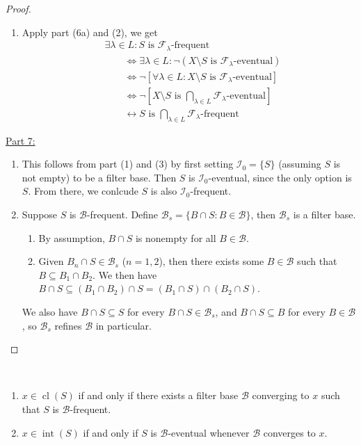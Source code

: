 \documentclass{treatise}
\begin{document}
\begin{proof}
\begin{enumerate}[label=(\alph*)]
    \item Apply part (6a) and (2), we get
    \begin{align*}
        & \exists \lambda \in L: S \mbox{ is } \mathcal{F}_\lambda \mbox{-frequent}
        \\
        & \qquad \Leftrightarrow \exists \lambda \in L: \neg(X \setminus S \mbox{ is } \mathcal{F}_\lambda \mbox{-eventual})
        \\
        & \qquad \Leftrightarrow \neg [\forall \lambda \in L: X \setminus S \mbox{ is } \mathcal{F}_\lambda \mbox{-eventual}]
        \\
        & \qquad \Leftrightarrow \neg \left[ X \setminus S \mbox{ is } \bigcap_{\lambda \in L} \mathcal{F}_\lambda \mbox{-eventual} \right]
        \\
        & \qquad \leftrightarrow S \mbox{ is } \bigcap_{\lambda \in L} \mathcal{F}_\lambda \mbox{-frequent}
    \end{align*}
\end{enumerate}
\underline{Part 7:}
\begin{enumerate}[label=(\alph*)]
    \item This follows from part (1) and (3) by first setting $\mathcal{I}_0 = \{ S \}$ (assuming $S$ is not empty) to be a filter base. Then $S$ is $\mathcal{I}_0$-eventual, since the only option is $S$. From there, we conlcude $S$ is also $\mathcal{I}_0$-frequent.
    \item Suppose $S$ is $\mathcal{B}$-frequent. Define $\mathcal{B}_s = \{ B \cap S : B \in \mathcal{B} \}$, then $\mathcal{B}_s$ is a filter base.
    \begin{enumerate}
        \item By assumption, $B \cap S$ is nonempty for all $B \in \mathcal{B}$.
        \item Given $B_n \cap S \in \mathcal{B}_s$ ($n = 1, 2$), then there exists some $B \in \mathcal{B}$ such that $B \subseteq B_1 \cap B_2$. We then have $B \cap S \subseteq (B_1 \cap B_2) \cap S = (B_1 \cap S) \cap (B_2 \cap S)$.
    \end{enumerate}
    We also have $B \cap S \subseteq S$ for every $B \cap S \in \mathcal{B}_s$, and $B \cap S \subseteq B$ for every $B \in \mathcal{B}$, so $\mathcal{B}_s$ refines $\mathcal{B}$ in particular.
\end{enumerate}
\end{proof}
\begin{theorem} \label{topo-filt-seq-conv} \ 
\begin{enumerate}
    \item $x \in \operatorname{cl}(S)$ if and only if there exists a filter base $\mathcal{B}$ converging to $x$ such that $S$ is $\mathcal{B}$-frequent.
    \item $x \in \operatorname{int}(S)$ if and only if $S$ is $\mathcal{B}$-eventual whenever $\mathcal{B}$ converges to $x$.
\end{enumerate}
\end{theorem}
\end{document}
